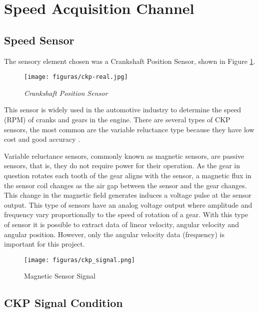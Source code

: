 \section{Speed Acquisition Channel}
			
	\subsection{Speed Sensor}
	
		The sensory element chosen was a Crankshaft Position Sensor, shown in Figure \ref{fig-ckpReal}.

		\begin{figure}[htbp]
			\centering
				\texttt{[image: figuras/ckp-real.jpg]}
			\caption{\textit{Crankshaft Position Sensor} \cite{ckp-gm}}
			\label{fig-ckpReal}
		\end{figure}

		This sensor is widely used in the automotive industry to determine the speed (RPM) of cranks and gears in the engine. There are several types of CKP sensors, the most common are the variable reluctance type because they have low cost and good accuracy \cite{schroeder2002crankshaft}.
		\par
		Variable reluctance sensors, commonly known as magnetic sensors, are passive sensors, that is, they do not require power for their operation. As the gear in question rotates each tooth of the gear aligns with the sensor, a magnetic flux in the sensor coil changes as the air gap between the sensor and the gear changes. This change in the magnetic field generates induces a voltage pulse at the sensor output. This type of sensors have an analog voltage output where amplitude and frequency vary proportionally to the speed of rotation of a gear. With this type of sensor it is possible to extract data of linear velocity, angular velocity and angular position. However, only the angular velocity data (frequency) is important for this project.

		\begin{figure}[htbp]
			\centering
				\texttt{[image: figuras/ckp\_signal.png]}
			\caption{Magnetic Sensor Signal \cite{cam-sensor-signal}}
			\label{fig-ckpSignal}
		\end{figure}

	\subsection{CKP Signal Condition}